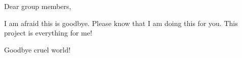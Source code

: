 Dear group members,

I am afraid this is goodbye.
Please know that I am doing this for you.
This project is everything for me!

Goodbye cruel world!